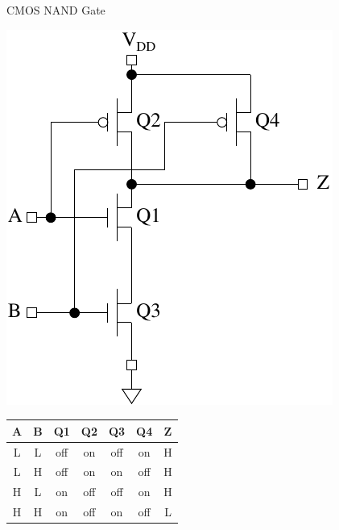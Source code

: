 \begin{frame}{CMOS NAND Gate}
  \begin{center}
    \includegraphics[scale=0.8]{CMOSNANDGate}
  \end{center}
\end{frame}

\begin{tabular}{ccccccc}
  \textbf{A} & \textbf{B} & \textbf{Q1} & \textbf{Q2} & \textbf{Q3} & \textbf{Q4} & \textbf{Z} \\
  \hline
  L & L & off & on & off & on & H\\
  L & H & off & on & on & off & H\\
  H & L & on & off & off & on & H\\
  H & H & on & off & on & off & L\\
\end{tabular}

